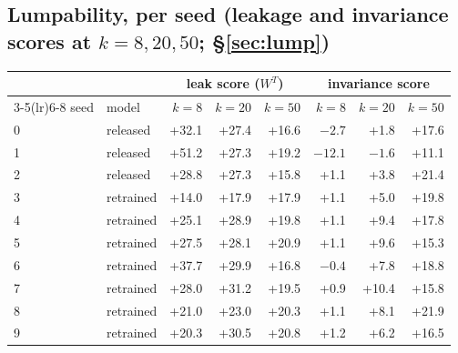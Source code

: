 \documentclass[11pt]{article}
\begin{document}
\subsection{Lumpability, per seed (leakage and invariance scores at $k=8,20,50$; \S\ref{sec:lump})}
\begin{center}\small
\begin{tabular}{llrrrrrr}
\toprule
& & \multicolumn{3}{c}{leak score ($W^{T}$)} & \multicolumn{3}{c}{invariance score}\\
\cmidrule(lr){3-5}\cmidrule(lr){6-8}
seed & model & $k{=}8$ & $k{=}20$ & $k{=}50$ & $k{=}8$ & $k{=}20$ & $k{=}50$ \\
\midrule
0 & released & +32.1 & +27.4 & +16.6 & $-2.7$ & +1.8 & +17.6 \\
1 & released & +51.2 & +27.3 & +19.2 & $-12.1$ & $-1.6$ & +11.1 \\
2 & released & +28.8 & +27.3 & +15.8 & +1.1 & +3.8 & +21.4 \\
3 & retrained & +14.0 & +17.9 & +17.9 & +1.1 & +5.0 & +19.8 \\
4 & retrained & +25.1 & +28.9 & +19.8 & +1.1 & +9.4 & +17.8 \\
5 & retrained & +27.5 & +28.1 & +20.9 & +1.1 & +9.6 & +15.3 \\
6 & retrained & +37.7 & +29.9 & +16.8 & $-0.4$ & +7.8 & +18.8 \\
7 & retrained & +28.0 & +31.2 & +19.5 & +0.9 & +10.4 & +15.8 \\
8 & retrained & +21.0 & +23.0 & +20.3 & +1.1 & +8.1 & +21.9 \\
9 & retrained & +20.3 & +30.5 & +20.8 & +1.2 & +6.2 & +16.5 \\
\bottomrule
\end{tabular}
\end{center}
\end{document}
